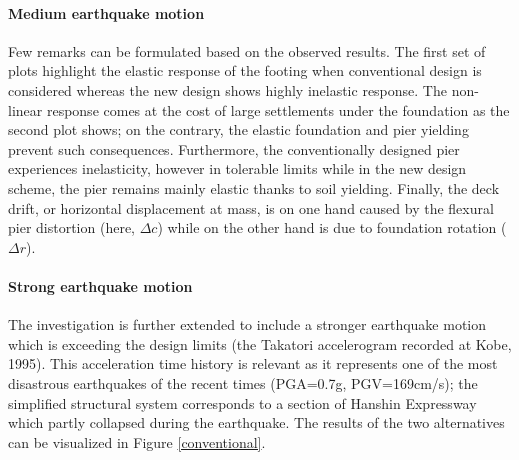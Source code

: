 \documentclass[12pt,a4paper]{report}
\begin{document}
\paragraph{Medium earthquake motion}
Few remarks can be formulated based on the observed results. The first set of plots highlight the elastic response of the footing when conventional design is considered whereas the new design shows highly inelastic response. The non-linear response comes at the cost of large settlements under the foundation as the second plot shows; on the contrary, the elastic foundation and pier yielding prevent such consequences. Furthermore, the conventionally designed pier experiences \mbox{inelasticity}, however in tolerable limits while in the new design scheme, the pier remains mainly elastic thanks to soil yielding. Finally, the deck drift, or horizontal displacement at mass, is on one hand caused by the flexural pier distortion (here, $\Delta c$) while on the other hand is due to foundation rotation ($\Delta r$). 

\newpage
\paragraph{Strong earthquake motion}
The investigation is further extended to include a stronger earthquake motion which is exceeding the design limits (the Takatori accelerogram recorded at Kobe, 1995). This acceleration time history is relevant as it represents one of the most disastrous earthquakes of the recent times (PGA=0.7g, PGV=169cm/s); the simplified structural system corresponds to a section of Hanshin Expressway which partly collapsed during the earthquake. The results of the two alternatives can be visualized in Figure \ref{conventional}.
\end{document}
